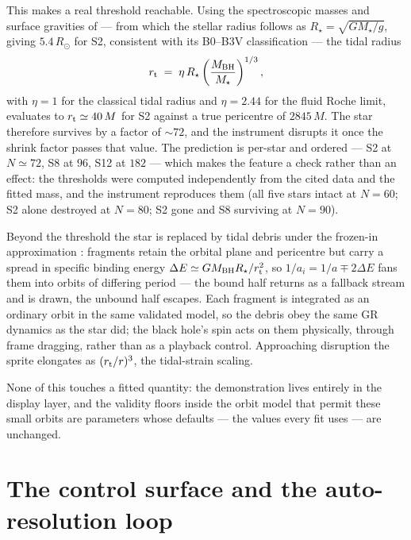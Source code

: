 This makes a real threshold reachable. Using the spectroscopic masses
and surface gravities of \citet{Habibi2017} — from which the stellar
radius follows as $R_\star=\sqrt{GM_\star/g}$, giving $5.4\,R_\odot$
for S2, consistent with its B0--B3V classification — the tidal radius
\begin{equation}
r_{\rm t} \;=\; \eta\,R_\star\left(\frac{M_{\rm BH}}{M_\star}\right)^{1/3},
\label{eq:tidalradius}
\end{equation}
with $\eta=1$ for the classical tidal radius and $\eta=2.44$ for the
fluid Roche limit, evaluates to $r_{\rm t}\simeq40\,M$ for S2 against a
true pericentre of $2845\,M$. The star therefore survives by a factor
of $\sim$$72$, and the instrument disrupts it once the shrink factor
passes that value. The prediction is per-star and ordered — S2 at
$N\simeq72$, S8 at $96$, S12 at $182$ — which makes the feature a check
rather than an effect: the thresholds were computed independently from
the cited data and the fitted mass, and the instrument reproduces them
(all five stars intact at $N=60$; S2 alone destroyed at $N=80$; S2 gone
and S8 surviving at $N=90$).

Beyond the threshold the star is replaced by tidal debris under the
frozen-in approximation \citep{Rees1988}: fragments retain the orbital
plane and pericentre but carry a spread in specific binding energy
$\Delta E \simeq GM_{\rm BH}R_\star/r_{\rm t}^2$, so
$1/a_i = 1/a \mp 2\Delta E$ fans them into orbits of differing period —
the bound half returns as a fallback stream and is drawn, the unbound
half escapes. Each fragment is integrated as an ordinary orbit in the
same validated model, so the debris obey the same GR dynamics as the
star did; the black hole's spin acts on them physically, through frame
dragging, rather than as a playback control. Approaching disruption the
sprite elongates as $(r_{\rm t}/r)^3$, the tidal-strain scaling.

None of this touches a fitted quantity: the demonstration lives
entirely in the display layer, and the validity floors inside the orbit
model that permit these small orbits are parameters whose defaults —
the values every fit uses — are unchanged.

\section{The control surface and the auto-resolution loop}
\label{sec:controls}


